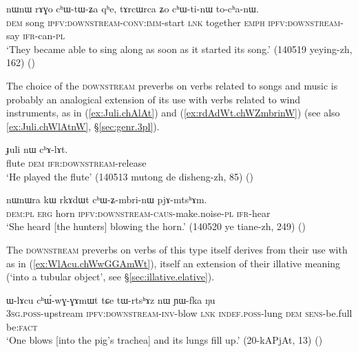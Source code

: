 \begin{exe}
\ex \label{ex:chWtinW.tochanW}
\gll  nɯnɯ rɤɣo cʰɯ-tɯ-ʑa qʰe, tɤrcɯrca ʑo cʰɯ-ti-nɯ to-cʰa-nɯ. \\
\textsc{dem} song \textsc{ipfv}:\textsc{downstream}-\textsc{conv}:\textsc{imm}-start \textsc{lnk} together \textsc{emph} \textsc{ipfv}:\textsc{downstream}-say \textsc{ifr}-can-\textsc{pl} \\
\glt `They became able to sing along as soon as it started its song.'  (140519 yeying-zh, 162)
()
\end{exe} 

The  choice of the \textsc{downstream} preverbs on verbs related to songs and music is probably an analogical extension of its use with verbs related to wind instruments, as in (\ref{ex:Juli.chAlAt}) and (\ref{ex:rdAdWt.chWZmbrinW}) (see also \ref{ex:Juli.chWlAtnW}, §\ref{sec:genr.3pl}).

\begin{exe}
\ex \label{ex:Juli.chAlAt}
\gll  ɟuli nɯ cʰɤ-lɤt. \\
flute \textsc{dem} \textsc{ifr}:\textsc{downstream}-release \\
\glt `He played the flute' (140513 mutong de disheng-zh, 85) ()
\end{exe}

\begin{exe}
\ex \label{ex:rdAdWt.chWZmbrinW}
\gll  nɯnɯra kɯ rkɤdɯt cʰɯ-ʑ-mbri-nɯ pjɤ-mtsʰɤm. \\
\textsc{dem}:\textsc{pl} \textsc{erg} horn \textsc{ipfv}:\textsc{downstream}-\textsc{caus}-make.noise-\textsc{pl} \textsc{ifr}-hear \\
\glt `She heard [the hunters] blowing the horn.' (140520 ye tiane-zh, 249) ()
\end{exe}

The \textsc{downstream} preverbs on verbs of this type itself derives from their use with  as in (\ref{ex:WlAcu.chWwGGAmWt}), itself an extension of their illative meaning (`into a tubular object', see §\ref{sec:illative.elative}).

\begin{exe}
\ex \label{ex:WlAcu.chWwGGAmWt}
\gll  ɯ-lɤcu cʰɯ́-wɣ-ɣɤmɯt tɕe tɯ-rtsʰɤz nɯ ɲɯ-fka ŋu \\
\textsc{3sg}.\textsc{poss}-upstream \textsc{ipfv}:\textsc{downstream}-\textsc{inv}-blow \textsc{lnk} \textsc{indef}.\textsc{poss}-lung \textsc{dem} \textsc{sens}-be.full be:\textsc{fact} \\
\glt  `One blows [into the pig's trachea] and its lungs fill up.' (20-kAPjAt, 13) ()
\end{exe}

